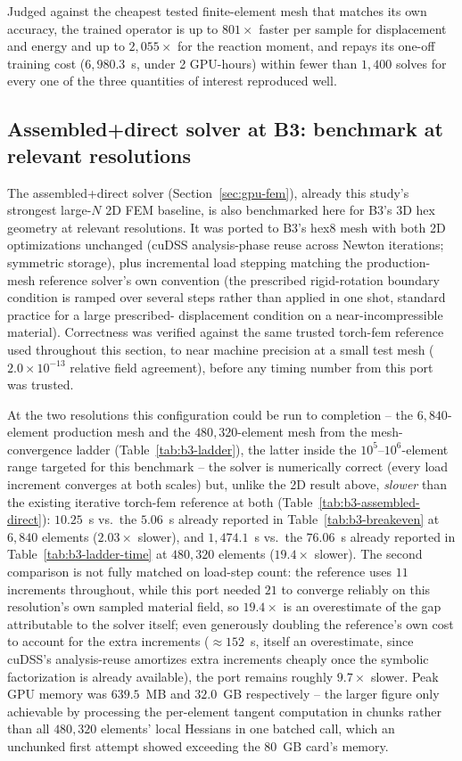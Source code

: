 \documentclass[final,5p,times]{elsarticle}
\begin{document}
Judged against the cheapest tested finite-element mesh that matches its
own accuracy, the trained operator is up to $801\times$ faster per
sample for displacement and energy and up to $2{,}055\times$ for the
reaction moment, and repays its one-off training cost ($6{,}980.3$~s,
under 2 GPU-hours) within fewer than $1{,}400$ solves for every one of
the three quantities of interest reproduced well.

\subsection{Assembled+direct solver at B3: benchmark at relevant resolutions}
\label{sec:b3-assembled-direct}
The assembled+direct solver (Section~\ref{sec:gpu-fem}), already this
study's strongest large-$N$ 2D FEM baseline, is also benchmarked here
for B3's 3D hex geometry at relevant resolutions. It was ported to B3's hex8 mesh with both 2D
optimizations unchanged (cuDSS analysis-phase reuse across Newton
iterations; symmetric storage), plus incremental load stepping matching
the production-mesh reference solver's own convention (the prescribed
rigid-rotation boundary condition is ramped over several steps rather
than applied in one shot, standard practice for a large prescribed-
displacement condition on a near-incompressible material). Correctness
was verified against the same trusted torch-fem reference used
throughout this section, to near machine precision at a small test mesh
($2.0\times10^{-13}$ relative field agreement), before any timing number
from this port was trusted.

At the two resolutions this configuration could be run to completion --
the $6{,}840$-element production mesh and the $480{,}320$-element mesh
from the mesh-convergence ladder (Table~\ref{tab:b3-ladder}), the latter
inside the $10^5$--$10^6$-element range targeted for this benchmark -- the
solver is numerically correct (every load increment converges at both
scales) but, unlike the 2D result above, \emph{slower} than the existing
iterative torch-fem reference at both (Table~\ref{tab:b3-assembled-direct}):
$10.25$~s vs.\ the $5.06$~s already reported in
Table~\ref{tab:b3-breakeven} at $6{,}840$ elements ($2.03\times$ slower),
and $1{,}474.1$~s vs.\ the $76.06$~s already reported in
Table~\ref{tab:b3-ladder-time} at $480{,}320$ elements ($19.4\times$
slower). The second comparison is not fully matched on load-step count:
the reference uses $11$ increments throughout, while this port needed
$21$ to converge reliably on this resolution's own sampled material
field, so $19.4\times$ is an overestimate of the gap attributable to the
solver itself; even generously doubling the reference's own cost to
account for the extra increments ($\approx152$~s, itself an
overestimate, since cuDSS's analysis-reuse amortizes extra increments
cheaply once the symbolic factorization is already available), the port
remains roughly $9.7\times$ slower. Peak GPU memory was $639.5$~MB and
$32.0$~GB respectively -- the larger figure only achievable by
processing the per-element tangent computation in chunks rather than
all $480{,}320$ elements' local Hessians in one batched call, which an
unchunked first attempt showed exceeding the $80$~GB card's memory.
\end{document}
